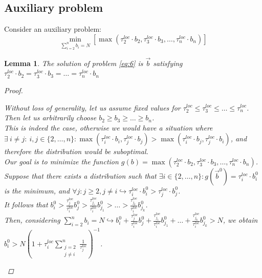 \documentclass{article}
\newtheorem{lemma}[theorem]{Lemma}
\begin{document}
\subsection{Auxiliary problem}
Consider an auxiliary problem:
\begin{equation}
    \label{eq:6}
    \underset{\sum\limits_{i = 2}^{n} b_i = N}{\min} [\max(\tau_2^{loc}\cdot b_2, \tau_3^{loc}\cdot b_3, \ldots, \tau_n^{loc}\cdot b_n)]
\end{equation}


\begin{lemma}
    \label{l1}
    The solution of problem \ref{eq:6} is $\overrightarrow{b}$ satisfying $\tau_2^{loc}\cdot b_2 = \tau_3^{loc}\cdot b_3 = \ldots = \tau_n^{loc}\cdot b_n$

    \begin{proof}
        \begin{spacing}{1.3}
        
        Without loss of generality, let us assume fixed values for $\tau_2^{loc}\leq \tau_3^{loc}\leq \ldots \leq \tau_n^{loc}$. \\
        Then let us arbitrarily choose $b_2\geq b_3\geq \ldots \geq b_n$.
        \\
        This is indeed the case, otherwise we would have a situation where $\exists ~ i \neq j: ~ i, j\in \{2, \ldots, n\} : \max(\tau_i^{loc}\cdot b_i, \tau_j^{loc}\cdot b_j) > \max(\tau_i^{loc}\cdot b_j, \tau_j^{loc}\cdot b_i)$, and therefore the distribution would be suboptimal. 
        \\
        Our goal is to minimize the function $g(b) = \max(\tau_2^{loc}\cdot b_2, \tau_3^{loc}\cdot b_3, \ldots, \tau_n^{loc}\cdot b_n)$. 
        \\
        Suppose that there exists a distribution such that $\exists i \in \{2, \ldots, n\}: g(\overrightarrow{b}^0) = \tau_i^{loc}\cdot b_i^0$ is the minimum, and $\forall j: j \geq 2, j \neq i \hookrightarrow \tau_i^{loc}\cdot b_i^0 > \tau_j^{loc}\cdot b_j^0$. 
        \\
        It follows that $b_i^0 > \frac{\tau_j^{loc}}{\tau_i^{loc}}b_j^0 > \frac{\tau_{j_1}^{loc}}{\tau_i^{loc}}b_{j_1}^0 > \ldots > \frac{\tau_{j_k}^{loc}}{\tau_i^{loc}}b_{j_k}^0$. 
        \\
        Then, considering $\sum\limits_{i = 2}^n b_i = N \hookrightarrow b_i^0 + \frac{\tau_j^{loc}}{\tau_i^{loc}}b_j^0 + \frac{\tau_{j_1}^{loc}}{\tau_i^{loc}}b_{j_1}^0 + \ldots + \frac{\tau_{j_k}^{loc}}{\tau_i^{loc}}b_{j_k}^0 > N$,
        we obtain 
        \\
        $b_i^0 > N(1 + \tau_i^{loc}\sum\limits_{\substack{j = 2 \\ j \neq i}}^n \frac{1}{\tau_j^{loc}})^{-1}$.
        

\end{spacing}
\end{proof}
\end{lemma}
\end{document}
